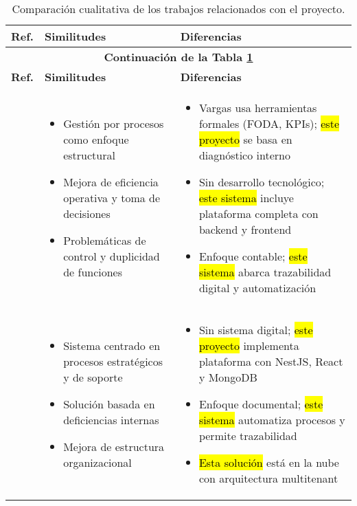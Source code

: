 \begin{longtable}{m{.05\paperwidth} *{2}{m{.33\paperwidth}} @{}}
	\caption{Comparación cualitativa de los trabajos relacionados con el proyecto.}
	\label{table:trabajosRelacionados}\\
	\hline
	\textbf{Ref.} & \textbf{Similitudes} & \textbf{Diferencias} \\
	\hline
	\endfirsthead
	
	\multicolumn{3}{c}{\textbf{Continuación de la Tabla \ref{table:trabajosRelacionados}}} \\
	\hline
	\textbf{Ref.} & \textbf{Similitudes} & \textbf{Diferencias} \\
	\hline
	\endhead
	\hline
	\endlastfoot

	\cite{Vargas2018} &
	\begin{itemize}
	  \item Gestión por procesos como enfoque estructural
	  \item Mejora de eficiencia operativa y toma de decisiones
	  \item Problemáticas de control y duplicidad de funciones
	\end{itemize} &
	\begin{itemize}
	  \item Vargas usa herramientas formales (FODA, KPIs); \hl{este proyecto} se basa en diagnóstico interno
	  \item Sin desarrollo tecnológico; \hl{este sistema} incluye plataforma completa con backend y frontend
	  \item Enfoque contable; \hl{este sistema} abarca trazabilidad digital y automatización
	\end{itemize} \\	
\midrule

\cite{Munoz2018} &
\begin{itemize}
  \item Sistema centrado en procesos estratégicos y de soporte
  \item Solución basada en deficiencias internas
  \item Mejora de estructura organizacional
\end{itemize} &
\begin{itemize}
  \item Sin sistema digital; \hl{este proyecto} implementa plataforma con NestJS, React y MongoDB
  \item Enfoque documental; \hl{este sistema} automatiza procesos y permite trazabilidad
  \item \hl{Esta solución} está en la nube con arquitectura multitenant
\end{itemize} \\


\end{longtable}
